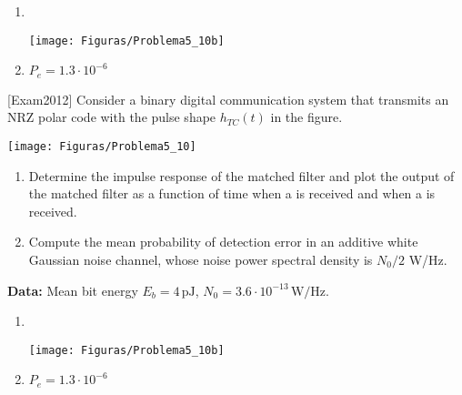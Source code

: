 \documentclass[es,boletin]{uah}
\begin{document}
{
	\begin{enumerate}
		\item \ \\
		\begin{center}\texttt{[image: Figuras/Problema5\_10b]}\end{center}
  		\item $P_e = 1.3 \cdot 10^{-6}$ 
	\end{enumerate}
}
{
	[Exam2012] Consider a binary digital communication system that transmits an NRZ polar code with the pulse shape $h_{TC}(t)$ in the figure.

	\begin{center}\texttt{[image: Figuras/Problema5\_10]}\end{center}

\begin{enumerate}
	\item Determine the impulse response of the matched filter and plot the output of the matched filter as a function of time when a  is received and when a  is received.
	\item Compute the mean probability of detection error in an additive white Gaussian noise channel, whose noise power spectral density is $N_0/2$ W/Hz.
\end{enumerate}

{\bf Data:} Mean bit energy $E_b = 4 \,\textrm{pJ}$, $N_0 = 3.6\cdot 10^{-13} \,\textrm{W/Hz}$.
}
{
	\begin{enumerate}
		\item \ \\
		\begin{center}\texttt{[image: Figuras/Problema5\_10b]}\end{center}
  		\item $P_e = 1.3 \cdot 10^{-6}$ 
	\end{enumerate}
}
\end{document}

